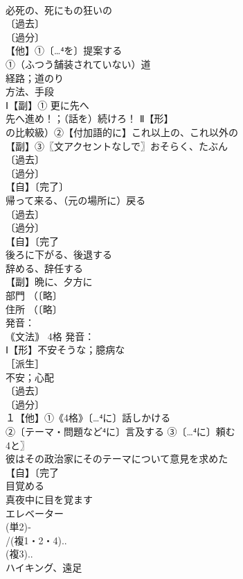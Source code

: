 \documentclass[8pt]{extreport}
\begin{document}
\begin{CJK}{UTF8}{min}
\\	必死の、死にもの狂いの
\\	〔過去〕
\\	〔過分〕
\\	【他】①〔…⁴を〕提案する 
\\	①（ふつう舗装されていない）道 
\\	経路；道のり　
\\	方法、手段
\\	Ⅰ【副】① 更に先へ 
\\	先へ進め！；（話を）続けろ！ Ⅱ【形】
\\	の比較級）②【付加語的に】これ以上の、これ以外の
\\	【副】③〖文アクセントなしで〗おそらく、たぶん
\\	〔過去〕
\\	〔過分〕
\\	【自】〔完了〕
\\	帰って来る、（元の場所に）戻る 
\\	〔過去〕
\\	〔過分〕
\\	【自】〔完了
\\	後ろに下がる、後退する 
\\	辞める、辞任する
\\	【副】晩に、夕方に 
\\	部門 （〔略〕
\\	住所 （〔略〕
\\	発音：
\\	｟文法｠ 4格 発音：
\\	Ⅰ【形】不安そうな；臆病な 
\\	［派生］ 
\\	不安；心配
\\	〔過去〕
\\	〔過分〕
\\	１【他】①《4格》〔…⁴に〕話しかける 
\\	②〔テーマ・問題など⁴に〕言及する ③〔…⁴に〕頼む　
\\	4と〗
\\	彼はその政治家にそのテーマについて意見を求めた
\\	【自】〔完了
\\	目覚める 
\\	真夜中に目を覚ます
\\	エレベーター 
\\	(単2)‐
\\	/(複1・2・4).. 
\\	(複3).. 
\\	ハイキング、遠足 

\end{CJK}
\end{document}
